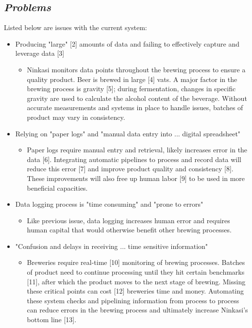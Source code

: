 \documentclass[draftclsnofoot,onecolumn,letterpaper,10pt]{IEEEtran}
\begin{document}
\subsection{\textit{Problems}}
Listed below are issues with the current system:
\begin{itemize}
    \item {Producing "large" [2] amounts of data and failing to effectively capture and leverage data [3]}
        \begin{itemize}
            \item {Ninkasi monitors data points throughout the brewing process to ensure a quality product. Beer is brewed in large [4] vats. A major factor in the brewing process is gravity [5]; during fermentation, changes in specific gravity are used to calculate the alcohol content of the beverage. Without accurate measurements and systems in place to handle issues, batches of product may vary in consistency.}
        \end{itemize}
\item {Relying on "paper logs" and "manual data entry into ... digital spreadsheet"}
        \begin{itemize}
\item {Paper logs require manual entry and retrieval, likely increases error in the data [6]. Integrating automatic pipelines to process and record data will reduce this error [7] and improve product quality and consistency [8]. These improvements will also free up human labor [9] to be used in more beneficial capacities.}
        \end{itemize}
\item {Data logging process is "time consuming" and "prone to errors"}
        \begin{itemize}
\item {Like previous issue, data logging increases human error and requires human capital that would otherwise benefit other brewing processes.}
        \end{itemize}
\item {"Confusion and delays in receiving ... time sensitive information"}
        \begin{itemize}
\item {Breweries require real-time [10] monitoring of brewing processes. Batches of product need to continue processing until they hit certain benchmarks [11], after which the product moves to the next stage of brewing. Missing these critical points can cost [12] breweries time and money. Automating these system checks and pipelining information from process to process can reduce errors in the brewing process and ultimately increase Ninkasi’s bottom line [13].}

\end{itemize}
\end{itemize}
\end{document}
